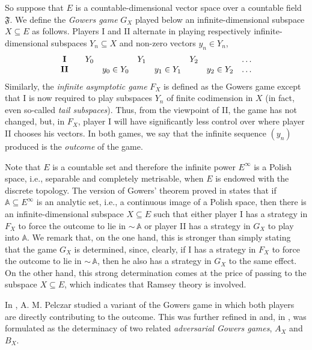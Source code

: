 \documentclass[10pt]{amsart}
\newcommand{\compl}{{\sim\!}}
\newcommand {\A}{\mathbb A}
\theoremstyle{definition}
\begin{document}
So suppose that $E$ is a countable-dimensional vector space over a countable field $\mathfrak F$. We define the {\em Gowers game} $G_X$ played below an infinite-dimensional subspace $X\subseteq E$ as follows. Players I and II alternate in playing respectively infinite-dimensional subspaces $Y_n\subseteq X$ and non-zero vectors $y_n\in Y_n$,
$$
{
\begin{array}{cccccccccccc}
{\bf I} & &Y_0 &&Y_1  & &Y_2  &&\ldots \\
{\bf II} & & &y_0\in Y_0  & &  y_1\in Y_1&    &y_2\in Y_2&\ldots
\end{array}
}
$$
Similarly, the {\em infinite asymptotic game} $F_X$ is defined as the Gowers game except that I is now required to play subspaces $Y_n$ of finite codimension in $X$ (in fact, even so-called {\em tail subspaces}). Thus, from the viewpoint of II, the game has not changed, but, in $F_X$, player  I will have significantly less control over where player II chooses his vectors. In both games, we say that the infinite sequence $(y_n)$ produced is the {\em outcome} of the game. 

Note that $E$ is a countable set and therefore the infinite power $E^\infty$ is a Polish space, i.e., separable and completely metrisable, when $E$ is endowed with the discrete topology. The version of Gowers' theorem proved in \cite{exact} states that if $\A\subseteq E^\infty$ is an analytic set, i.e., a continuous image of a Polish space, then there is an infinite-dimensional subspace $X\subseteq E$ such that either player I has a strategy in $F_X$ to force the outcome to lie in $\compl\, \A$ or player II has a strategy in $G_X$ to play into $\A$. We remark that, on the one hand, this is stronger than simply stating that the game $G_X$ is determined, since, clearly, if I has a strategy in $F_X$ to force the outcome to lie in $\compl\, \A$, then he also has a strategy in $G_X$ to the same effect. On the other hand, this strong determination comes at the price of passing to the subspace $X\subseteq E$, which indicates that Ramsey theory is involved. 

In \cite{pelczar}, A. M. Pelczar studied a variant of the Gowers game in which both players are directly contributing to the outcome. This was further refined in \cite{minimal} and, in  \cite{exact}, was formulated as the determinacy of two related {\em adversarial Gowers games}, $A_X$ and $B_X$. 
\end{document}
